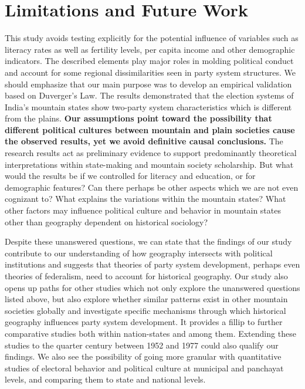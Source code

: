 \begin{sloppypar}
\section{Limitations and Future Work}
This study avoids testing explicitly for the potential influence of variables such as literacy rates as well as fertility levels, per capita income and other demographic indicators. The described elements play major roles in molding political conduct and account for some regional dissimilarities seen in party system structures. We should emphasize that our main purpose was to develop an empirical validation based on Duverger's Law. The results demonstrated that the election systems of India's mountain states show two-party system characteristics which is different from the plains. \textbf{Our assumptions point toward the possibility that different political cultures between mountain and plain societies cause the observed results, yet we avoid definitive causal conclusions.} The research results act as preliminary evidence to support predominantly theoretical interpretations within state-making and mountain society scholarship. But what would the results be if we controlled for literacy and education, or for demographic features? Can there perhaps be other aspects which we are not even cognizant to?  What explains the variations within the mountain states? What other factors may influence political culture and behavior in mountain states other than geography dependent on historical sociology?  

Despite these unanswered questions, we can state that the findings of our study contribute to our understanding of how geography intersects with political institutions and suggests that theories of party system development, perhaps even theories of federalism, need to account for historical geography. Our study also opens up paths for other studies which not only explore the unanswered questions listed above, but also explore whether similar patterns exist in other mountain societies globally and investigate specific mechanisms through which historical geography influences party system development. It provides a fillip to further comparative studies both within nation-states and among them. Extending these studies to the quarter century between 1952 and 1977  could also qualify our findings. We also see the possibility of going more granular with quantitative studies of electoral behavior and political culture at municipal and panchayat levels, and comparing them to state and national levels. 


\end{sloppypar}
